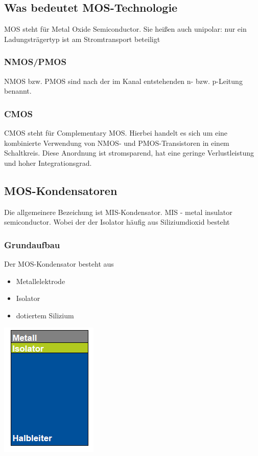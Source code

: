\subsection{Was bedeutet MOS-Technologie}
MOS steht für Metal Oxide Semiconductor.
Sie heißen auch unipolar: nur ein Ladungsträgertyp ist am Stromtransport beteiligt
	\subsubsection{NMOS/PMOS}
		NMOS bzw. PMOS sind nach der im Kanal entstehenden n- bzw. p-Leitung benannt.
	\subsubsection{CMOS}
		CMOS steht für Complementary MOS.
		Hierbei handelt es sich um eine kombinierte Verwendung von NMOS- und PMOS-Transistoren in einem Schaltkreis. Diese Anordnung ist stromsparend, hat eine geringe Verlustleistung und hoher Integrationsgrad.
\subsection{MOS-Kondensatoren}
	Die allgemeinere Bezeichung ist MIS-Kondensator. MIS - metal insulator semiconductor. Wobei der der Isolator  häufig aus Siliziumdioxid besteht
	\subsubsection{Grundaufbau}
	Der MOS-Kondensator besteht aus 
	\begin{itemize}
		\item Metallelektrode
		\item Isolator
		\item dotiertem Silizium		
	\end{itemize}	
	\begin{center}
		\includegraphics[width=0.2\linewidth]{Kapitel/Kap06/MOSKondensator}
	\end{center}
	
